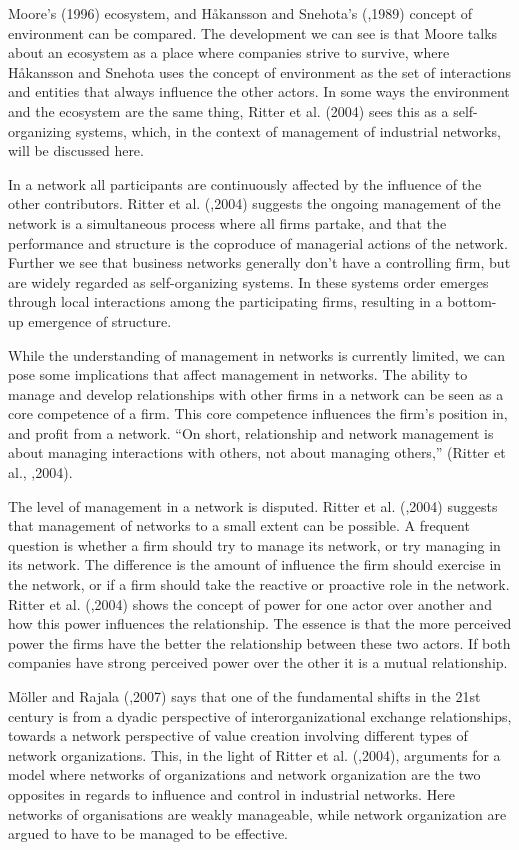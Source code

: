 \documentclass[12pt,journal,compsoc]{IEEEtran}
\begin{document}
Moore’s (1996) ecosystem, and Håkansson and
Snehota’s (\cite{hakansson},1989) concept of environment can be compared. The
development we can see is that Moore talks about an ecosystem as a place where
companies strive to survive, where Håkansson and Snehota uses the concept of
environment as the set of interactions and entities that always influence the
other actors. In some ways the environment and the ecosystem are the same thing,
Ritter et al. (2004) sees this as a self-organizing systems, which, in the
context of management of industrial networks, will be discussed here.

In a network all participants are continuously affected by the influence of the
other contributors. Ritter et al. (\cite{ritter},2004) suggests the ongoing management of the network is a simultaneous process where all firms partake, and that the performance and structure is the coproduce of managerial actions of the network. Further we see that business networks generally don’t have a controlling firm, but are widely regarded as self-organizing systems. In these systems order emerges through local interactions among the participating firms, resulting in a bottom-up emergence of structure.

While the understanding of management in networks is currently limited, we can
pose some implications that affect management in networks. The ability to manage
and develop relationships with other firms in a network can be seen as a core
competence of a firm. This core competence influences the firm’s position in,
and profit from a network. “On short, relationship and network management is
about managing interactions with others, not about managing others,” (Ritter et
al., \cite{ritter},2004).

The level of management in a network is disputed. Ritter et al.
(\cite{ritter},2004) suggests that management of networks to a small extent can
be possible. A frequent question is whether a firm should try to manage its
network, or try managing in its network. The difference is the amount of
influence the firm should exercise in the network, or if a firm should take the
reactive or proactive role in the network. Ritter et al. (\cite{ritter},2004) shows the concept of power for one actor over another and how this power influences the relationship. The essence is that the more perceived power the firms have the better the relationship between these two actors. If both companies have strong perceived power over the other it is a mutual relationship.

Möller and Rajala (\cite{moller},2007) says that one of the fundamental shifts
in the 21st century is from a dyadic perspective of interorganizational exchange
relationships, towards a network perspective of value creation involving
different types of network organizations. This, in the light of Ritter et al.
(\cite{ritter},2004), arguments for a model where networks of organizations and network organization are the two opposites in regards to influence and control in industrial networks. Here networks of organisations are weakly manageable, while network organization are argued to have to be managed to be effective.
\end{document}
